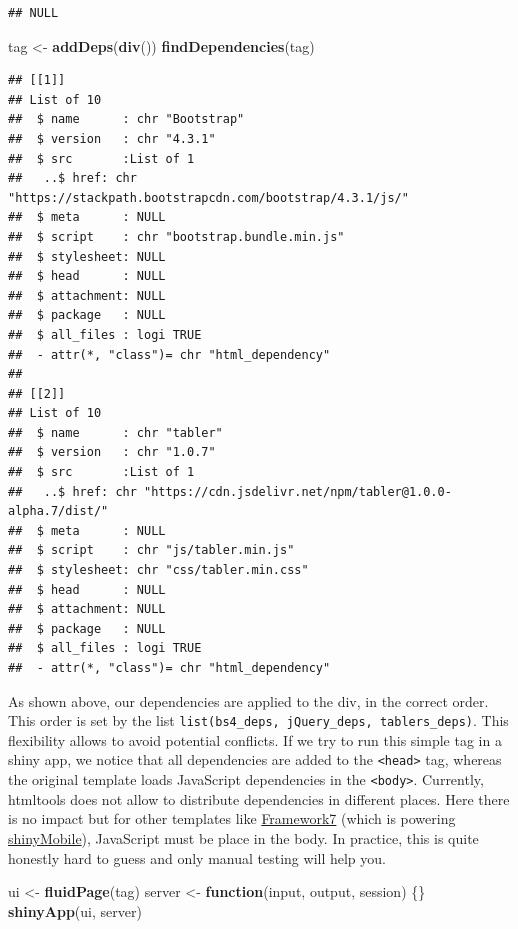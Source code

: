 \documentclass[]{book}
\newenvironment{Shaded}{\begin{snugshade}}{\end{snugshade}}
\newcommand{\ControlFlowTok}[1]{\textcolor[rgb]{0.13,0.29,0.53}{\textbf{#1}}}
\newcommand{\KeywordTok}[1]{\textcolor[rgb]{0.13,0.29,0.53}{\textbf{#1}}}
\newcommand{\NormalTok}[1]{#1}
\newcommand{\StringTok}[1]{\textcolor[rgb]{0.31,0.60,0.02}{#1}}
\begin{document}
\begin{verbatim}
## NULL
\end{verbatim}

\begin{Shaded}
\begin{Highlighting}[]
\NormalTok{tag <-}\StringTok{ }\KeywordTok{addDeps}\NormalTok{(}\KeywordTok{div}\NormalTok{())}
\KeywordTok{findDependencies}\NormalTok{(tag)}
\end{Highlighting}
\end{Shaded}

\begin{verbatim}
## [[1]]
## List of 10
##  $ name      : chr "Bootstrap"
##  $ version   : chr "4.3.1"
##  $ src       :List of 1
##   ..$ href: chr "https://stackpath.bootstrapcdn.com/bootstrap/4.3.1/js/"
##  $ meta      : NULL
##  $ script    : chr "bootstrap.bundle.min.js"
##  $ stylesheet: NULL
##  $ head      : NULL
##  $ attachment: NULL
##  $ package   : NULL
##  $ all_files : logi TRUE
##  - attr(*, "class")= chr "html_dependency"
## 
## [[2]]
## List of 10
##  $ name      : chr "tabler"
##  $ version   : chr "1.0.7"
##  $ src       :List of 1
##   ..$ href: chr "https://cdn.jsdelivr.net/npm/tabler@1.0.0-alpha.7/dist/"
##  $ meta      : NULL
##  $ script    : chr "js/tabler.min.js"
##  $ stylesheet: chr "css/tabler.min.css"
##  $ head      : NULL
##  $ attachment: NULL
##  $ package   : NULL
##  $ all_files : logi TRUE
##  - attr(*, "class")= chr "html_dependency"
\end{verbatim}

As shown above, our dependencies are applied to the div, in the correct order. This order is set by the list \texttt{list(bs4\_deps,\ jQuery\_deps,\ tablers\_deps)}. This flexibility allows to avoid potential conflicts. If we try to run this simple tag in a shiny app, we notice that all dependencies are added to the \texttt{\textless{}head\textgreater{}} tag, whereas the original template loads JavaScript dependencies in the \texttt{\textless{}body\textgreater{}}. Currently, htmltools does not allow to distribute dependencies in different places. Here there is no impact but for other templates like \href{https://framework7.io}{Framework7} (which is powering \href{https://github.com/RinteRface/shinyMobile}{shinyMobile}), JavaScript must be place in the body. In practice, this is quite honestly hard to guess and only manual testing will help you.

\begin{Shaded}
\begin{Highlighting}[]
\NormalTok{ui <-}\StringTok{ }\KeywordTok{fluidPage}\NormalTok{(tag)}
\NormalTok{server <-}\StringTok{ }\ControlFlowTok{function}\NormalTok{(input, output, session) \{\}}
\KeywordTok{shinyApp}\NormalTok{(ui, server)}
\end{Highlighting}
\end{Shaded}
\end{document}
